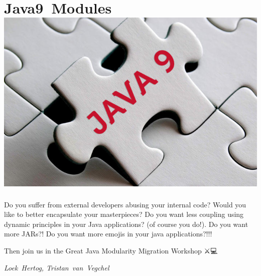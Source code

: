 
\section*{Java9~Modules\hfill\includegraphics[width=.35\linewidth]{images/java9-jigsaw.jpg}}

Do you suffer from external developers abusing your internal code? Would you like to better encapsulate your masterpieces? Do you want less coupling using dynamic principles in your Java applications? (of course you do!). Do you want more JARs?! Do you want more emojis in your java applications?!!!

Then join us in the Great Java Modularity Migration Workshop ⚔💻🐒

\hfill\textit{Loek~Hertog, Tristan~van~Vegchel}